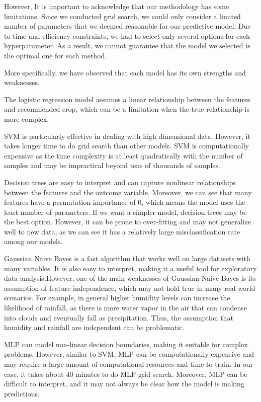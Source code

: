 \documentclass{article}
\begin{document}
However, It is important to acknowledge that our methodology has some limitations. Since we conducted grid search, we could only consider a limited number of parameters that we deemed reasonable for our predictive model. Due to time and efficiency constraints, we had to select only several options for each hyperparameter. As a result, we cannot guarantee that the model we selected is the optimal one for each method.

More specifically, we have observed that each model has its own strengths and weaknesses. 

The logistic regression model assumes a linear relationship between the features and recommended crop, which can be a limitation when the true relationship is more complex. 

SVM is particularly effective in dealing with high dimensional data. However, it takes longer time to do grid search than other models. SVM is computationally expensive as the time complexity is at least quadratically with the number of samples and may be impractical beyond tens of thousands of samples. 

Decision trees are easy to interpret and can capture nonlinear relationships between the features and the outcome variable. Moreover, we can see that many features have a permutation importance of 0, which means the model uses the least number of parameters. If we want a simpler model, decision trees may be the best option. However, it can be prone to over-fitting and may not generalize well to new data, as we can see it has a relatively large misclassification rate among our models.

Gaussian Naive Bayes is a fast algorithm that works well on large datasets with many variables. It is also easy to interpret, making it a useful tool for exploratory data analysis.However, one of the main weaknesses of Gaussian Naive Bayes is its assumption of feature independence, which may not hold true in many real-world scenarios. For example, in general higher humidity levels can increase the likelihood of rainfall, as there is more water vapor in the air that can condense into clouds and eventually fall as precipitation. Thus, the assumption that humidity and rainfall are independent can be problematic. 

MLP can model non-linear decision boundaries, making it suitable for complex problems. However, similar to SVM, MLP can be computationally expensive and may require a large amount of computational resources and time to train. In our case, it takes about 40 minutes to do MLP grid search. Moreover, MLP can be difficult to interpret, and it may not always be clear how the model is making predictions.
\end{document}

